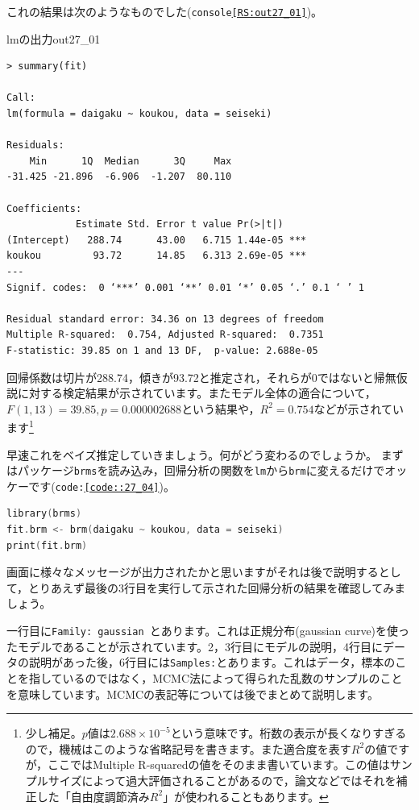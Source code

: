 \documentclass{ltjbook}
\begin{document}
これの結果は次のようなものでした(\texttt{console\ref{RS:out27_01}})。
\begin{Rscreen}{lmの出力}{out27_01}
\begin{verbatim}
> summary(fit)

Call:
lm(formula = daigaku ~ koukou, data = seiseki)

Residuals:
    Min      1Q  Median      3Q     Max 
-31.425 -21.896  -6.906  -1.207  80.110 

Coefficients:
            Estimate Std. Error t value Pr(>|t|)    
(Intercept)   288.74      43.00   6.715 1.44e-05 ***
koukou         93.72      14.85   6.313 2.69e-05 ***
---
Signif. codes:  0 ‘***’ 0.001 ‘**’ 0.01 ‘*’ 0.05 ‘.’ 0.1 ‘ ’ 1

Residual standard error: 34.36 on 13 degrees of freedom
Multiple R-squared:  0.754,	Adjusted R-squared:  0.7351 
F-statistic: 39.85 on 1 and 13 DF,  p-value: 2.688e-05
\end{verbatim}
\end{Rscreen}
回帰係数は切片が288.74，傾きが93.72と推定され，それらが0ではないと帰無仮説に対する検定結果が示されています。またモデル全体の適合について，$F(1,13)=39.85,p=0.000002688$という結果や，$R^2=0.754$などが示されています\footnote{少し補足。$p$値は$2.688\times 10^{-5}$という意味です。桁数の表示が長くなりすぎるので，機械はこのような省略記号を書きます。また適合度を表す$R^2$の値ですが，ここではMultiple R-squaredの値をそのまま書いています。この値はサンプルサイズによって過大評価されることがあるので，論文などではそれを補正した「自由度調節済み$R^2$」が使われることもあります。}

早速これをベイズ推定していきましょう。何がどう変わるのでしょうか。
まずはパッケージ\texttt{brms}を読み込み，回帰分析の関数を\texttt{lm}から\texttt{brm}に変えるだけでオッケーです(\texttt{code:\ref{code::27_04}})。

\begin{lstlisting}[language=c++,label={code::27_04},caption={ベイズ推定してみる}]
library(brms)
fit.brm <- brm(daigaku ~ koukou, data = seiseki)
print(fit.brm)
\end{lstlisting}

画面に様々なメッセージが出力されたかと思いますがそれは後で説明するとして，とりあえず最後の3行目を実行して示された回帰分析の結果を確認してみましょう。

一行目に\texttt{Family: gaussian }とあります。これは正規分布(gaussian curve)を使ったモデルであることが示されています。2，3行目にモデルの説明，4行目にデータの説明があった後，6行目には\texttt{Samples:}とあります。これはデータ，標本のことを指しているのではなく，MCMC法によって得られた乱数のサンプルのことを意味しています。MCMCの表記等については後でまとめて説明します。
\end{document}
